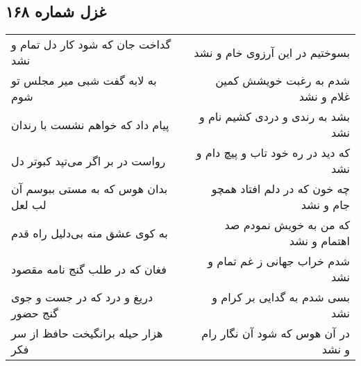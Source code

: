 \begin{center}
\section*{غزل شماره ۱۶۸}
\label{sec:sh168}
\begin{longtable}{l p{0.5cm} r}
گداخت جان که شود کار دل تمام و نشد
&&
بسوختیم در این آرزوی خام و نشد
\\
به لابه گفت شبی میر مجلس تو شوم
&&
شدم به رغبت خویشش کمین غلام و نشد
\\
پیام داد که خواهم نشست با رندان
&&
بشد به رندی و دردی کشیم نام و نشد
\\
رواست در بر اگر می‌تپد کبوتر دل
&&
که دید در ره خود تاب و پیچ دام و نشد
\\
بدان هوس که به مستی ببوسم آن لب لعل
&&
چه خون که در دلم افتاد همچو جام و نشد
\\
به کوی عشق منه بی‌دلیل راه قدم
&&
که من به خویش نمودم صد اهتمام و نشد
\\
فغان که در طلب گنج نامه مقصود
&&
شدم خراب جهانی ز غم تمام و نشد
\\
دریغ و درد که در جست و جوی گنج حضور
&&
بسی شدم به گدایی بر کرام و نشد
\\
هزار حیله برانگیخت حافظ از سر فکر
&&
در آن هوس که شود آن نگار رام و نشد
\\
\end{longtable}
\end{center}
